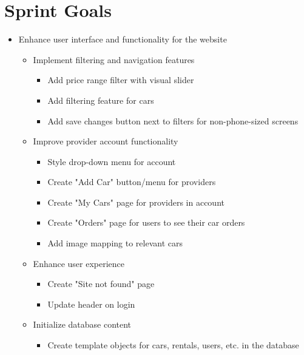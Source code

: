 \documentclass[a4paper,12pt]{article}
\begin{document}
\section*{Sprint Goals}
\begin{itemize}
    \item Enhance user interface and functionality for the website
    \begin{itemize}
        \item Implement filtering and navigation features
        \begin{itemize}
            \item Add price range filter with visual slider
            \item Add filtering feature for cars
            \item Add save changes button next to filters for non-phone-sized screens
        \end{itemize}
        \item Improve provider account functionality
        \begin{itemize}
            \item Style drop-down menu for account
            \item Create "Add Car" button/menu for providers
            \item Create "My Cars" page for providers in account
            \item Create "Orders" page for users to see their car orders
            \item Add image mapping to relevant cars
        \end{itemize}
        \item Enhance user experience
        \begin{itemize}
            \item Create "Site not found" page
            \item Update header on login
        \end{itemize}
        \item Initialize database content
        \begin{itemize}
            \item Create template objects for cars, rentals, users, etc. in the database
        \end{itemize}
    \end{itemize}
\end{itemize}
\end{document}
